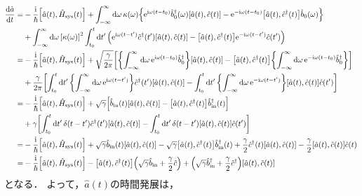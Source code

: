 \documentclass{report}
\begin{document}
      \begin{align}
        \dv{\hat{a}}{t}(t) =& -\frac{\mathrm{i}}{\hbar}\qty[\hat{a}(t), \hat{H}_{\mathrm{sys}}(t)] + \int_{-\infty}^{\infty}\dd{\omega}\kappa(\omega)\qty{\mathrm{e}^{\mathrm{i}\omega(t - t_0)}\hat{b}^{\dag}_0(\omega)\qty[\hat{a}(t), \hat{c}(t)] - \mathrm{e}^{-\mathrm{i}\omega(t - t_0)}\qty[\hat{a}(t), \hat{c}^{\dag}(t)]\hat{b}_0(\omega)} \\ 
        &+ \int_{-\infty}^{\infty}\dd{\omega}\qty[\kappa(\omega)]^2\int_{t_0}^{t}\dd{t'}\qty(\mathrm{e}^{\mathrm{i}\omega(t - t')}\hat{c}^{\dag}(t')\qty[\hat{a}(t), \hat{c}(t)] - \qty[\hat{a}(t), \hat{c}^{\dag}(t)]\mathrm{e}^{-\mathrm{i}\omega(t - t')}\hat{c}(t')) \\ 
        =& -\frac{\mathrm{i}}{\hbar}\qty[\hat{a}(t), \hat{H}_{\mathrm{sys}}(t)] + \sqrt{\frac{\gamma}{2\pi}}\qty[\qty{\int_{-\infty}^{\infty}\dd{\omega}\mathrm{e}^{\mathrm{i}\omega(t - t_0)}\hat{b}^{\dag}_0}\qty[\hat{a}(t), \hat{c}(t)] - \qty[\hat{a}(t), \hat{c}^{\dag}(t)]\qty{\int_{-\infty}^{\infty}\dd{\omega}\mathrm{e}^{-\mathrm{i}\omega(t - t_0)}\hat{b}^{\dag}_0}] \\ 
        &+ \frac{\gamma}{2\pi}\qty[\int_{t_0}^{t}\dd{t'}\qty{\int_{-\infty}^{\infty}\dd{\omega}\mathrm{e}^{\mathrm{i}\omega(t - t')}}\hat{c}^{\dag}(t')\qty[\hat{a}(t), \hat{c}(t)] - \int_{t_0}^{t}\dd{t'}\qty{\int_{-\infty}^{\infty}\dd{\omega}\mathrm{e}^{-\mathrm{i}\omega(t - t')}}\qty[\hat{a}(t), \hat{c}(t)]\hat{c}(t')] \\ 
        =& -\frac{\mathrm{i}}{\hbar}\qty[\hat{a}(t), \hat{H}_{\mathrm{sys}}(t)] + \sqrt{\gamma}\qty[\hat{b}_{\mathrm{in}}(t)\qty[\hat{a}(t), \hat{c}(t)] - \qty[\hat{a}(t), \hat{c}^{\dag}(t)]\hat{b}^{\dag}_{\mathrm{in}}(t)] \\ 
        &+ \gamma\qty[\int_{t_0}^{t}\dd{t'}\delta(t - t')\hat{c}^{\dag}(t')\qty[\hat{a}(t), \hat{c}(t)] - \int_{t_0}^{t}\dd{t'}\delta(t - t')\qty[\hat{a}(t), \hat{c}(t)]\hat{c}(t')] \\ 
        =& -\frac{\mathrm{i}}{\hbar}\qty[\hat{a}(t), \hat{H}_{\mathrm{sys}}(t)] + \sqrt{\gamma}\hat{b}_{\mathrm{in}}(t)\qty[\hat{a}(t), \hat{c}(t)] - \sqrt{\gamma}\qty[\hat{a}(t), \hat{c}^{\dag}(t)]\hat{b}^{\dag}_{\mathrm{in}}(t) + \frac{\gamma}{2}\hat{c}^{\dag}(t)\qty[\hat{a}(t), \hat{c}(t)] - \frac{\gamma}{2}\qty[\hat{a}(t), \hat{c}(t)]\hat{c}(t) \\ 
        =& -\frac{\mathrm{i}}{\hbar}\qty[\hat{a}(t), \hat{H}_{\mathrm{sys}}(t)] - \qty[\hat{a}(t), \hat{c}^{\dag}(t)]\qty(\sqrt{\gamma}\hat{b}_{\mathrm{in}} + \frac{\gamma}{2}\hat{c}) + \qty(\sqrt{\gamma}\hat{b}^{\dag}_{\mathrm{in}} + \frac{\gamma}{2}\hat{c}^{\dag})\qty[\hat{a}(t), \hat{c}(t)] 
      \end{align}
      となる．
      よって，$\hat{a}(t)$の時間発展は，
\end{document}
